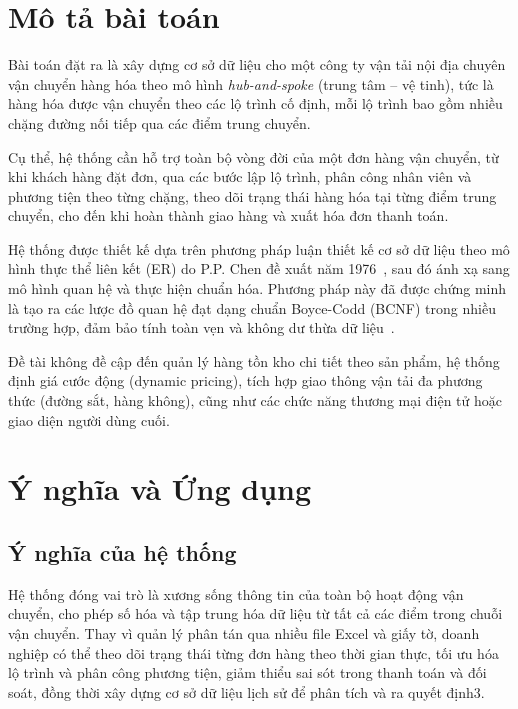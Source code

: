 \documentclass[11pt]{report}
\begin{document}

\section{Mô tả bài toán}
\label{sec:motabaitoan}

Bài toán đặt ra là xây dựng cơ sở dữ liệu cho một công ty vận tải nội địa chuyên vận chuyển hàng hóa theo mô hình \textit{hub-and-spoke} (trung tâm -- vệ tinh), tức là hàng hóa được vận chuyển theo các lộ trình cố định, mỗi lộ trình bao gồm nhiều chặng đường nối tiếp qua các điểm trung chuyển.

Cụ thể, hệ thống cần hỗ trợ toàn bộ vòng đời của một đơn hàng vận chuyển, từ khi khách hàng đặt đơn, qua các bước lập lộ trình, phân công nhân viên và phương tiện theo từng chặng, theo dõi trạng thái hàng hóa tại từng điểm trung chuyển, cho đến khi hoàn thành giao hàng và xuất hóa đơn thanh toán.

Hệ thống được thiết kế dựa trên phương pháp luận thiết kế cơ sở dữ liệu theo mô hình thực thể liên kết (ER) do P.P. Chen đề xuất năm 1976~\cite{chen1976entity}, sau đó ánh xạ sang mô hình quan hệ và thực hiện chuẩn hóa. Phương pháp này đã được chứng minh là tạo ra các lược đồ quan hệ đạt dạng chuẩn Boyce-Codd (BCNF) trong nhiều trường hợp, đảm bảo tính toàn vẹn và không dư thừa dữ liệu~\cite{ieee1989er}.

Đề tài không đề cập đến quản lý hàng tồn kho chi tiết theo sản phẩm, hệ thống định giá cước động (dynamic pricing), tích hợp giao thông vận tải đa phương thức (đường sắt, hàng không), cũng như các chức năng thương mại điện tử hoặc giao diện người dùng cuối.


\section{Ý nghĩa và Ứng dụng}
\label{sec:ynghiavaungdung}

\subsection{Ý nghĩa của hệ thống}
Hệ thống đóng vai trò là xương sống thông tin của toàn bộ hoạt động vận chuyển, cho phép số hóa và tập trung hóa dữ liệu từ tất cả các điểm trong chuỗi vận chuyển. Thay vì quản lý phân tán qua nhiều file Excel và giấy tờ, doanh nghiệp có thể theo dõi trạng thái từng đơn hàng theo thời gian thực, tối ưu hóa lộ trình và phân công phương tiện, giảm thiểu sai sót trong thanh toán và đối soát, đồng thời xây dựng cơ sở dữ liệu lịch sử để phân tích và ra quyết định3.
\end{document}
